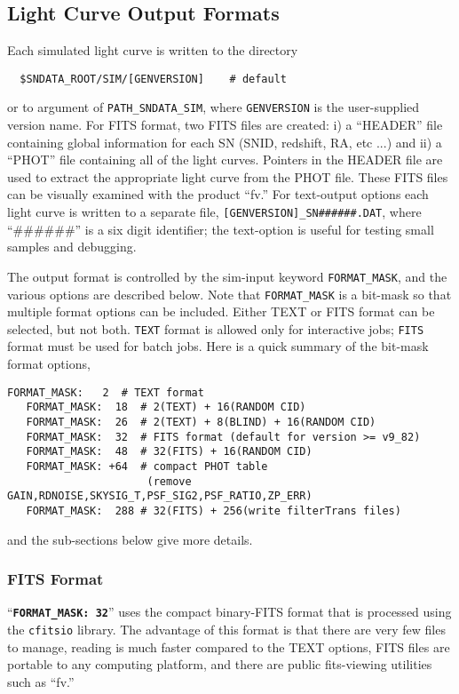 \documentclass[12pt]{article}
\begin{document}
  \clearpage
   \subsection{Light Curve Output Formats}
   \label{subsec:sim_formats}

Each simulated light curve is written 
to the directory
\begin{verbatim}
  $SNDATA_ROOT/SIM/[GENVERSION]    # default
\end{verbatim}
or to argument of {\tt PATH\_SNDATA\_SIM},
where {\tt GENVERSION} is the user-supplied version name.
For FITS format, two FITS files are created: 
i) a ``HEADER'' file containing global information 
for each SN (SNID, redshift, RA, etc ...) 
and ii) a ``PHOT'' file containing all of the light curves.
Pointers in the HEADER file are used to extract the
appropriate light curve from the PHOT file.
These FITS files can be visually examined with the product ``fv.''
For text-output options each light curve is written to a
separate file, {\tt [GENVERSION]\_SN\#\#\#\#\#\#.DAT},
where ``\#\#\#\#\#\#'' is a six digit identifier;
the text-option is useful for testing small samples and
debugging. 


The output format is controlled by the sim-input keyword
{\tt FORMAT\_MASK}, and the various options are described
below. Note that {\tt FORMAT\_MASK} is a bit-mask so that
multiple format options can be included.
Either TEXT or FITS format can be selected, but not both.
{\tt TEXT} format is allowed only for interactive jobs; 
{\tt FITS} format must be used for batch jobs.
Here is a quick summary of the bit-mask format options,
%

\begin{Verbatim}[frame=single]
   FORMAT_MASK:   2  # TEXT format
   FORMAT_MASK:  18  # 2(TEXT) + 16(RANDOM CID)
   FORMAT_MASK:  26  # 2(TEXT) + 8(BLIND) + 16(RANDOM CID)
   FORMAT_MASK:  32  # FITS format (default for version >= v9_82)
   FORMAT_MASK:  48  # 32(FITS) + 16(RANDOM CID)
   FORMAT_MASK: +64  # compact PHOT table 
                      (remove GAIN,RDNOISE,SKYSIG_T,PSF_SIG2,PSF_RATIO,ZP_ERR)
   FORMAT_MASK:  288 # 32(FITS) + 256(write filterTrans files)
\end{Verbatim}
%
and the sub-sections below give more details.

   \subsubsection{FITS Format}
   \label{sss:fits_format}
``{\tt\bf FORMAT\_MASK:  32}'' 
uses the compact binary-FITS format that is processed using the 
{\tt cfitsio} library. 
The advantage of this format is that there are very few files
to manage, reading is much faster compared to the TEXT options, 
FITS files are portable to any computing platform,
and there are public fits-viewing utilities such as ``fv.''
\end{document}
